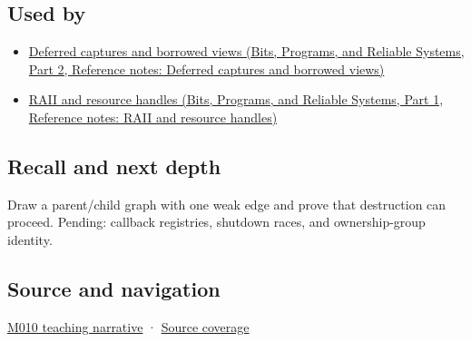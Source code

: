 \subsection{Used by}\label{appendix-b9548675eb2b-used-by}

\hypertarget{appendix-b9548675eb2b-used-by}{}

\begin{itemize}
\tightlist
\item
  \href{../01-Bits-Programs-and-Reliable-Systems-P02/main.pdf\#nameddest=appendix-aea529eb5175}{Deferred captures and borrowed views (Bits, Programs, and Reliable Systems, Part 2, Reference notes: Deferred captures and borrowed views)}
\item
  \href{../01-Bits-Programs-and-Reliable-Systems-P01/main.pdf\#nameddest=appendix-69739d3ab49b}{RAII and resource handles (Bits, Programs, and Reliable Systems, Part 1, Reference notes: RAII and resource handles)}
\end{itemize}

\subsection{Recall and next depth}\label{appendix-b9548675eb2b-recall-and-next-depth}

\hypertarget{appendix-b9548675eb2b-recall-and-next-depth}{}

Draw a parent/child graph with one weak edge and prove that destruction can proceed. Pending: callback registries, shutdown races, and ownership-group identity.

\subsection{Source and navigation}\label{appendix-b9548675eb2b-source-and-navigation}

\hypertarget{appendix-b9548675eb2b-source-and-navigation}{}

\hyperref[01-foundations-i-ch004-weak-observation-breaks-cycles-without-pretending-an-object-is-alive]{M010 teaching narrative} · \hyperref[appendix-fd090d982a15-m010---parts-148-160]{Source coverage}
